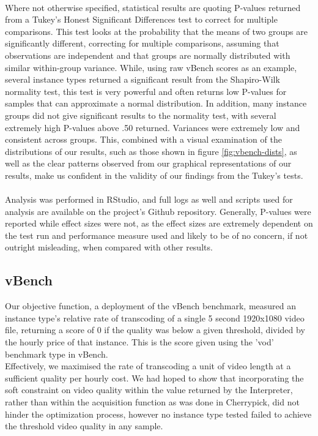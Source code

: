 \documentclass{report}
\begin{document}
\paragraph{}
Where not otherwise specified, statistical results are quoting P-values returned from a Tukey's Honest Significant Differences test to correct for multiple comparisons. This test looks at the probability that the means of two groups are significantly different, correcting for multiple comparisons, assuming that observations are independent and that groups are normally distributed with similar within-group variance. While, using raw vBench scores as an example, several instance types returned a significant result from the Shapiro-Wilk normality test, this test is very powerful and often returns low P-values for samples that can approximate a normal distribution. In addition, many  instance groups did not give significant results to the normality test, with several extremely high P-values above .50 returned. Variances were extremely low and consistent across groups. This, combined with a visual examination of the distributions of our results, such as those shown in figure \ref{fig:vbench-dists}, as well as the clear patterns observed from our graphical representations of our results, make us confident in the validity of our findings from the Tukey's tests.

\paragraph{}
Analysis was performed in RStudio\cite{RCoreTeam2018,RStudioTeam2016}, and full logs as well and scripts used for analysis are available on the project's Github repository. Generally, P-values were reported while effect sizes were not, as the effect sizes are extremely dependent on the test run and performance measure used and likely to be of no concern, if not outright misleading, when compared with other results.

\subsection{vBench}
Our objective function, a deployment of the vBench benchmark, measured an instance type's relative rate of transcoding of a single 5 second 1920x1080 video file, returning a score of 0 if the quality was below a given threshold, divided by the hourly price of that instance. This is the score given using the 'vod' benchmark type in vBench.\\
Effectively, we maximised the rate of transcoding a unit of video length at a sufficient quality per hourly cost. We had hoped to show that incorporating the soft constraint on video quality within the value returned by the Interpreter, rather than within the acquisition function as was done in Cherrypick, did not hinder the optimization process, however no instance type tested failed to achieve the threshold video quality in any sample.
\end{document}
